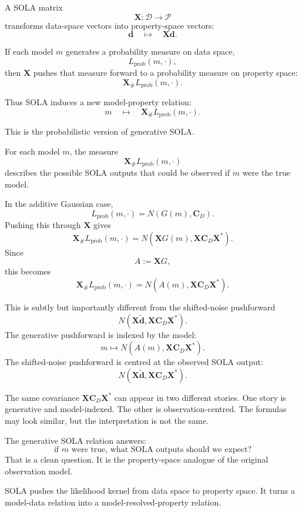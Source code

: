 \documentclass[11pt,openany]{book}
\theoremstyle{definition}
\theoremstyle{remark}
\newcommand{\D}{\mathcal D}
\newcommand{\Pspace}{\mathcal P}
\begin{document}
A SOLA matrix
\[
  \mathbf X:\D\to\Pspace
\]
transforms data-space vectors into property-space vectors:
\[
  \mathbf d
  \quad\longmapsto\quad
  \mathbf X\mathbf d.
\]

If each model \(m\) generates a probability measure on data space,
\[
  L_{\mathrm{prob}}(m,\cdot),
\]
then \(\mathbf X\) pushes that measure forward to a probability measure on property space:
\[
  \mathbf X_{\#}L_{\mathrm{prob}}(m,\cdot).
\]

Thus SOLA induces a new model-property relation:
\[
  m
  \quad\longmapsto\quad
  \mathbf X_{\#}L_{\mathrm{prob}}(m,\cdot).
\]

This is the probabilistic version of generative SOLA.

For each model \(m\), the measure
\[
  \mathbf X_{\#}L_{\mathrm{prob}}(m,\cdot)
\]
describes the possible SOLA outputs that could be observed if \(m\) were the true model.

In the additive Gaussian case,
\[
  L_{\mathrm{prob}}(m,\cdot)
  =
  N(G(m),\mathbf C_D).
\]
Pushing this through \(\mathbf X\) gives
\[
  \mathbf X_{\#}L_{\mathrm{prob}}(m,\cdot)
  =
  N(\mathbf XG(m),\mathbf X\mathbf C_D\mathbf X^*).
\]
Since
\[
  A:=\mathbf XG,
\]
this becomes
\[
  \mathbf X_{\#}L_{\mathrm{prob}}(m,\cdot)
  =
  N(A(m),\mathbf X\mathbf C_D\mathbf X^*).
\]

This is subtly but importantly different from the shifted-noise pushforward
\[
  N(\mathbf X\widetilde{\mathbf d},\mathbf X\mathbf C_D\mathbf X^*).
\]
The generative pushforward is indexed by the model:
\[
  m\mapsto N(A(m),\mathbf X\mathbf C_D\mathbf X^*).
\]
The shifted-noise pushforward is centred at the observed SOLA output:
\[
  N(\mathbf X\widetilde{\mathbf d},\mathbf X\mathbf C_D\mathbf X^*).
\]

\begin{warningbox}
The same covariance \(\mathbf X\mathbf C_D\mathbf X^*\) can appear in two different stories.
One story is generative and model-indexed. The other is observation-centred. The formulas may
look similar, but the interpretation is not the same.
\end{warningbox}

The generative SOLA relation answers:
\[
  \text{if }m\text{ were true, what SOLA outputs should we expect?}
\]
That is a clean question. It is the property-space analogue of the original observation model.

\begin{lessonbox}
SOLA pushes the likelihood kernel from data space to property space. It turns a model-data
relation into a model-resolved-property relation.
\end{lessonbox}
\end{document}
